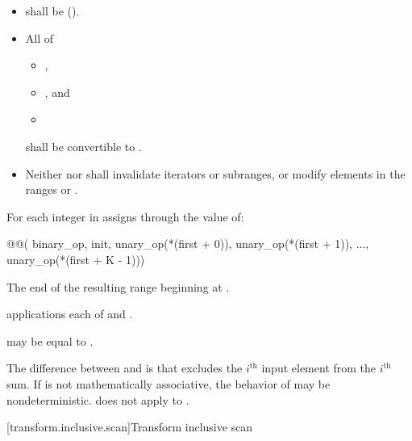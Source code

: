 \begin{itemdescr}
\pnum
\requires
\begin{itemize}
\item {} shall be  ().
\item All of
\begin{itemize}
\item {},
\item {}, and
\item {}
\end{itemize}
shall be convertible to .
\item Neither  nor  shall invalidate iterators or
subranges, or modify elements in the ranges
 or
.
\end{itemize}

\pnum
\effects
For each integer  in 
assigns through  the value of:
\begin{codeblock}
@@(
    binary_op, init,
    unary_op(*(first + 0)), unary_op(*(first + 1)), ..., unary_op(*(first + K - 1)))
\end{codeblock}

\pnum
\returns
The end of the resulting range beginning at .

\pnum
\complexity
{} applications each of  and
.

\pnum
\remarks
{} may be equal to .

\pnum
\begin{note}
The difference between  and
 is that 
excludes the $i^\text{th}$ input element from the $i^\text{th}$ sum. If  is not
mathematically associative, the behavior of 
may be nondeterministic.  does not apply
 to .
\end{note}
\end{itemdescr}

[transform.inclusive.scan]{Transform inclusive scan}

